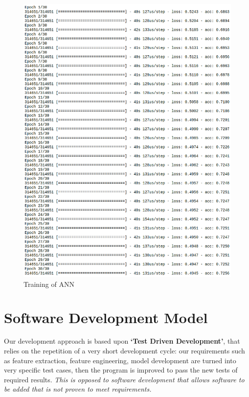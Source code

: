 \begin{figure}[H]
\begin{center}
	\includegraphics[width = 5in]{images/epoch.png}
	\caption{Training of \ac{ANN}} %
\end{center}
\end{figure}	
	
\newpage	
	
\par
\section{Software Development Model}
Our development approach is based upon \textbf{`Test Driven Development'}, that relies on the repetition of a very short development cycle: our requirements such as feature extraction, feature engineering, model development are turned into very specific test cases, then the program is improved to pass the new tests of required results. \textit{This is opposed to software development that allows software to be added that is not proven to meet requirements.}


